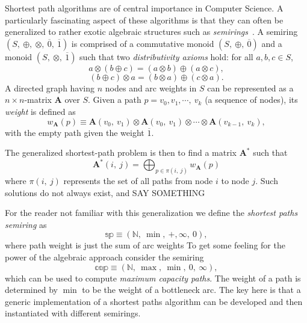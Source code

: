 Shortest path algorithms are of central importance in Computer Science. 
A particularly fascinating aspect of these algorithms is 
that they can often be generalized to rather exotic algebraic structures
such as \emph{semirings}~\cite{gondran_graphs_2008}.  
A semiring $(S,\ \oplus,\ \otimes,\ \overline{0},\ \overline{1})$ is 
comprised of a commutative monoid $(S,\ \oplus,\ \overline{0})$ 
and a monoid $(S,\ \otimes,\ \overline{1})$ such that 
two \emph{distributivity axioms} hold: 
for all $a, b, c \in S$, 
\begin{equation}
\label{eq:left:distributivity}
    a\otimes (b \oplus c) = (a\otimes b) \oplus (a\otimes c), 
\end{equation}
\begin{equation}
\label{eq:right:distributivity}
    (b \oplus c) \otimes a = (b\otimes a) \oplus (c\otimes a). 
\end{equation}
A directed graph having $n$ nodes and arc weights in $S$ 
can be represented as a $n\times n$-matrix $\mathbf{A}$ over $S$. 
Given a path $p = v_0, v_1, \cdots,\ v_k$ (a sequence of nodes), 
its {\em weight} is defined as 
\begin{equation}
\label{eq:def:weight}
    w_{\mathbf{A}}(p) 
    \equiv 
    \mathbf{A}(v_0,\ v_1) 
    \otimes \mathbf{A}(v_0,\ v_1) 
    \otimes \cdots 
    \otimes \mathbf{A}(v_{k-1},\ v_k),  
\end{equation}
with the empty path given the weight $\overline{1}$. 

The generalized shortest-path problem is then to find 
a matrix $\mathbf{A}^*$ such that 
\begin{equation}
\label{eq:global}
\mathbf{A}^*(i,\ j) = \displaystyle\bigoplus_{p \in \pi(i,\ j)} w_{\mathbf{A}}(p) 
\end{equation}
where $\pi(i,\ j)$ represents the set of all paths from node $i$ to node $j$. 
Such solutions do not always exist, and SAY SOMETHING 


For the reader not familiar with this generalization 
we define the \emph{shortest paths semiring} as 
\begin{equation}
\label{eq:def:sp}
\mathbb{sp} \equiv (\mathbb{N},\ \min,\ +, \infty,\ 0),
\end{equation}
where path weight is just the sum of arc weights
To get some feeling for the power of the 
algebraic approach consider the semiring 
\begin{equation}
\label{eq:def:cap}
\mathbb{cap} \equiv (\mathbb{N},\ \max,\ \min,\ 0,\ \infty),
\end{equation}
which can be used to compute \emph{maximum capacity paths}. 
The weight of a path is determined by $\min$ to be the 
weight of a bottleneck arc.  
The key here is that a generic implementation of a shortest
paths algorithm can be developed and then instantiated with 
different semirings. 

